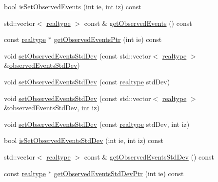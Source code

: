 \begin{DoxyCompactItemize}
\item 
bool \mbox{\hyperlink{classamici_1_1_exp_data_a7270ea1362212e4dc344e24dc01b70ee}{is\+Set\+Observed\+Events}} (int ie, int iz) const
\item 
std\+::vector$<$ \mbox{\hyperlink{namespaceamici_a1bdce28051d6a53868f7ccbf5f2c14a3}{realtype}} $>$ const  \& \mbox{\hyperlink{classamici_1_1_exp_data_a4f70119553de7d120b14600d7a6d5267}{get\+Observed\+Events}} () const
\item 
const \mbox{\hyperlink{namespaceamici_a1bdce28051d6a53868f7ccbf5f2c14a3}{realtype}} $\ast$ \mbox{\hyperlink{classamici_1_1_exp_data_a95ab3fe91af62612f202fdc6cd033d2a}{get\+Observed\+Events\+Ptr}} (int ie) const
\item 
void \mbox{\hyperlink{classamici_1_1_exp_data_af55c1775810031cd4b6e283f6dd220be}{set\+Observed\+Events\+Std\+Dev}} (const std\+::vector$<$ \mbox{\hyperlink{namespaceamici_a1bdce28051d6a53868f7ccbf5f2c14a3}{realtype}} $>$ \&\mbox{\hyperlink{classamici_1_1_exp_data_abb12a8f75b4e6c936ae6c0be770628c9}{observed\+Events\+Std\+Dev}})
\item 
void \mbox{\hyperlink{classamici_1_1_exp_data_a7be54ad0b0116325f4955f10a759a018}{set\+Observed\+Events\+Std\+Dev}} (const \mbox{\hyperlink{namespaceamici_a1bdce28051d6a53868f7ccbf5f2c14a3}{realtype}} std\+Dev)
\item 
void \mbox{\hyperlink{classamici_1_1_exp_data_a9fe1de066fcba20ce994d9817442a826}{set\+Observed\+Events\+Std\+Dev}} (const std\+::vector$<$ \mbox{\hyperlink{namespaceamici_a1bdce28051d6a53868f7ccbf5f2c14a3}{realtype}} $>$ \&\mbox{\hyperlink{classamici_1_1_exp_data_abb12a8f75b4e6c936ae6c0be770628c9}{observed\+Events\+Std\+Dev}}, int iz)
\item 
void \mbox{\hyperlink{classamici_1_1_exp_data_a2533798d195c8ede07c783800adf1d82}{set\+Observed\+Events\+Std\+Dev}} (const \mbox{\hyperlink{namespaceamici_a1bdce28051d6a53868f7ccbf5f2c14a3}{realtype}} std\+Dev, int iz)
\item 
bool \mbox{\hyperlink{classamici_1_1_exp_data_a29530529cf50b9fa791e02fed620ea7a}{is\+Set\+Observed\+Events\+Std\+Dev}} (int ie, int iz) const
\item 
std\+::vector$<$ \mbox{\hyperlink{namespaceamici_a1bdce28051d6a53868f7ccbf5f2c14a3}{realtype}} $>$ const  \& \mbox{\hyperlink{classamici_1_1_exp_data_a18cd150b527e08a9dd4a02b242a76d46}{get\+Observed\+Events\+Std\+Dev}} () const
\item 
const \mbox{\hyperlink{namespaceamici_a1bdce28051d6a53868f7ccbf5f2c14a3}{realtype}} $\ast$ \mbox{\hyperlink{classamici_1_1_exp_data_aabab4dfc080fdf961b6a3bbf1aebd631}{get\+Observed\+Events\+Std\+Dev\+Ptr}} (int ie) const
\end{DoxyCompactItemize}
